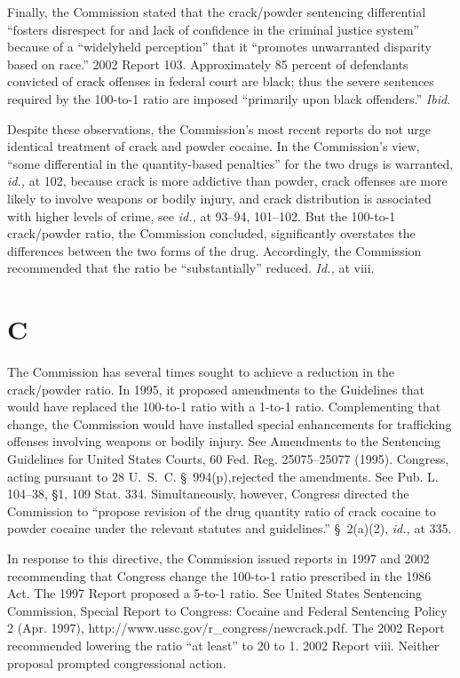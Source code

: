 {  Finally, the Commission stated that the crack/powder sentencing
differential ``fosters disrespect for and lack of confidence in the
criminal justice system'' because of a ``widelyheld perception''
that it ``promotes unwarranted disparity based on race.'' 2002 Report
103. Approximately 85 percent of defendants convicted of crack offenses
in federal court are black; thus the severe sentences required by
the 100-to-1 ratio are imposed ``primarily upon black offenders.''
\emph{Ibid.}

  Despite these observations, the Commission's most recent reports
do not urge identical treatment of crack and powder cocaine. In the
Commission's view, ``some differential in the quantity-based
penalties'' for the two drugs is warranted, \emph{id.,} at 102,
because crack is more addictive than powder, crack offenses are more
likely to involve weapons or bodily injury, and crack distribution is
associated with higher levels of crime, see \emph{id.,} at 93--94,
101--102. But the 100-to-1 crack/\newpage powder ratio, the Commission
concluded, significantly overstates the differences between the two
forms of the drug. Accordingly, the Commission recommended that the
ratio be ``substantially'' reduced. \emph{Id.,} at viii.

\section{C}

  The Commission has several times sought to achieve a reduction in the
crack/powder ratio. In 1995, it proposed amendments to the Guidelines
that would have replaced the 100-to-1 ratio with a 1-to-1 ratio.
Complementing that change, the Commission would have installed special
enhancements for trafficking offenses involving weapons or bodily
injury. See Amendments to the Sentencing Guidelines for United States
Courts, 60 Fed. Reg. 25075--25077 (1995). Congress, acting pursuant
to 28 U.~S.~C. \S~994(p),\footnotemark[9] rejected the amendments. See Pub.
L. 104--38, \S1, 109 Stat. 334. Simultaneously, however, Congress
directed the Commission to ``propose revision of the drug quantity
ratio of crack cocaine to powder cocaine under the relevant statutes and
guidelines.'' \S~2(a)(2), \emph{id.,} at 335.

  In response to this directive, the Commission issued reports
in 1997 and 2002 recommending that Congress change the 100-to-1
ratio prescribed in the 1986 Act. The 1997 Report proposed a 5-to-1
ratio. See United States Sentencing Commission, Special Report
to Congress: Cocaine and Federal Sentencing Policy 2 (Apr. 1997),
http://www.ussc.gov/r_congress/newcrack.pdf. The 2002 Report
recommended lowering the ratio ``at least'' to 20 to 1. 2002 Report
viii. Neither proposal prompted congressional action.

}
